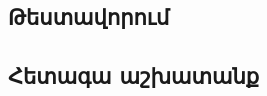 {
    \subsection{Թեստավորում}\label{subsec:testing}
    

    \subsection{Հետագա աշխատանք}\label{subsec:furtherWork}
    
}